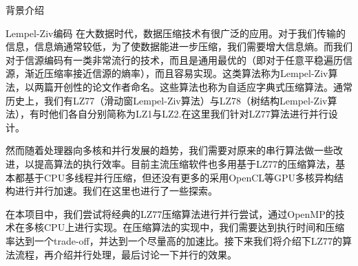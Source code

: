 \documentclass[letterpaper,12pt]{article}
\begin{document}
\begin{section}{背景介绍}
    \begin{subsection}{Lempel-Ziv编码}
        在大数据时代，数据压缩技术有很广泛的应用。对于我们传输的信息，信息熵通常较低，为了使数据能进一步压缩，我们需要增大信息熵。而我们对于信源编码有一类非常流行的技术，而且是通用最优的（即对于任意平稳遍历信源，渐近压缩率接近信源的熵率），而且容易实现。这类算法称为Lempel-Ziv算法，以两篇开创性的论文作者命名。这些算法也称为自适应字典式压缩算法。通常历史上，我们有LZ77（滑动窗Lempel-Ziv算法）与LZ78（树结构Lempel-Ziv算法），有时他们各自分别简称为LZ1与LZ2.在这里我们针对LZ77算法进行并行设计。\\ \par

        然而随着处理器向多核和并行发展的趋势，我们需要对原来的串行算法做一些改进，以提高算法的执行效率。目前主流压缩软件也多用基于LZ77的压缩算法，基本都基于CPU多线程并行压缩，但还没有更多的采用OpenCL等GPU多核异构结构进行并行加速。我们在这里也进行了一些探索。\\ \par

        在本项目中，我们尝试将经典的LZ77压缩算法进行并行尝试，通过OpenMP的技术在多核CPU上进行实现。在压缩算法的实现中，我们需要达到执行时间和压缩率达到一个trade-off，并达到一个尽量高的加速比。接下来我们将介绍下LZ77的算法流程，再介绍并行处理，最后讨论一下并行的效果。  

    \end{subsection}


\end{section}
\end{document}
